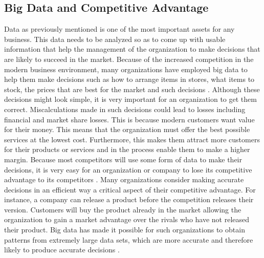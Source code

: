 \documentclass[sigconf]{acmart}
\begin{document}
\subsection{Big Data and Competitive Advantage}
Data as previously mentioned is one of the most important assets for any business. This data needs to be analyzed so as to come up with usable information that help the management of the organization to make decisions that are likely to succeed in the market. Because of the increased competition in the modern business environment, many organizations have employed big data to help them make decisions such as how to arrange items in stores, what items to stock, the prices that are best for the market and such decisions \cite{Walker2015}. Although these decisions might look simple, it is very important for an organization to get them correct. Miscalculations made in such decisions could lead to losses including financial and market share losses. This is because modern customers want value for their money. This means that the organization must offer the best possible services at the lowest cost. 
Furthermore, this makes them attract more customers for their products or services and in the process enable them to make a higher margin. Because most competitors will use some form of data to make their decisions, it is very easy for an organization or company to lose its competitive advantage to its competitors \cite{Walker2015}. Many organizations consider making accurate decisions in an efficient way a critical aspect of their competitive advantage. For instance, a company can release a product before the competition releases their version. Customers will buy the product already in the market allowing the organization to gain a market advantage over the rivals who have not released their product. Big data has made it possible for such organizations to obtain patterns from extremely large data sets, which are more accurate and therefore likely to produce accurate decisions \cite{Walker2015}.
\end{document}
